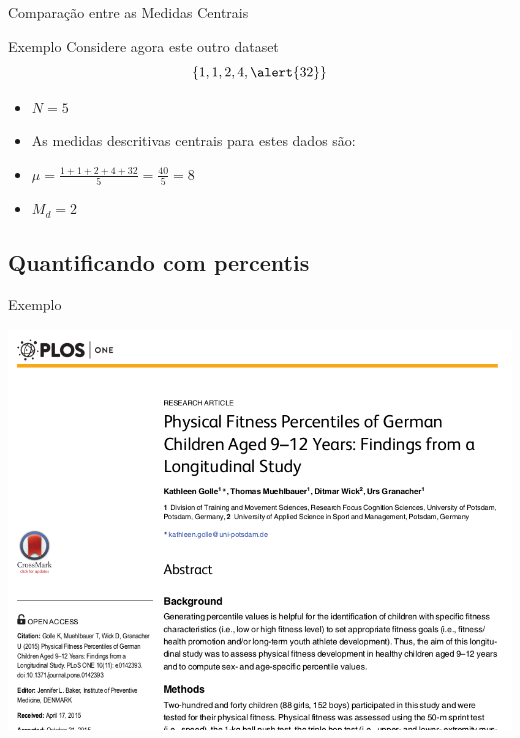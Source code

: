 \documentclass{beamer}
\begin{document}
\begin{frame}{Comparação entre as Medidas Centrais}
  \begin{exampleblock}{Exemplo}
    Considere agora este outro dataset $$\{
    1,1,2,4,\alert{32} \}$$
  \begin{itemize}
  \item $N=5$
  \item As medidas descritivas centrais para estes dados são:
  \item $\mu = \frac{1+1+2+4+32}{5} = \frac{40}{5}= 8$
  \item $M_d = 2$
  \end{itemize}
\end{exampleblock}
\end{frame}

\subsection{Quantificando com percentis}

\begin{frame}{Exemplo}
  \begin{center}
    \includegraphics[height=\textheight]{Cap3/percentil0}
  \end{center}
\end{frame}
\end{document}
